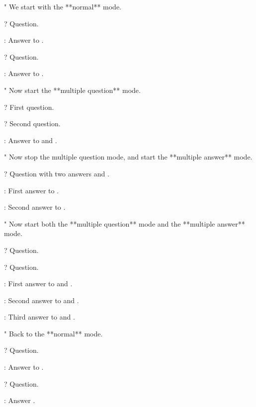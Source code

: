 "
  We start with the **normal** mode.

? 
  Question.

:
  Answer to .

? 
  Question.

:
  Answer to .

"
  Now start the **multiple question** mode.

\EnableMultipleQuestion

? 
  First question.

? 
  Second question.

:
  Answer to  and .

"
  Now stop the multiple question mode, and start the **multiple answer** mode.

\DisableMultipleQuestion

\EnableMultipleAnswer

? 
  Question with two answers  and .

: 
  First answer to .

: 
  Second answer to .

"
  Now start both the **multiple question** mode and the **multiple answer** mode.

\EnableMultipleQuestion

\EnableMultipleAnswer

? 
  Question.

? 
  Question.

:
  First answer to  and .

:
  Second answer to  and .

:
  Third answer to  and .

"
  Back to the **normal** mode.

\DisableMultipleQuestion

\DisableMultipleAnswer

? 
  Question.

:
  Answer to .

? 
  Question.

:
  Answer .

